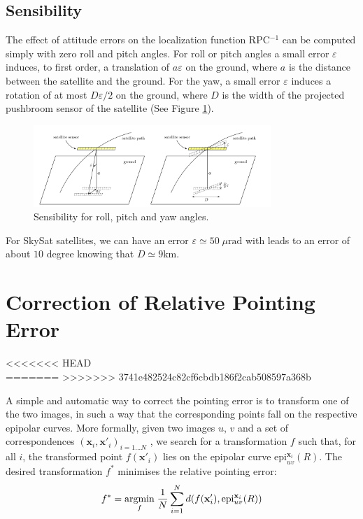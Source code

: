 \documentclass[paper=a4, fontsize=11pt, onecolumn, tikz, dvipsnames, svgnames, x11names]{article}
\begin{document}
\subsection{Sensibility}
\label{subsec:sensibility}
The effect of attitude errors on the localization function RPC$^{-1}$ can be computed simply with zero roll and pitch angles. For roll or pitch angles
a small error $\varepsilon$ induces, to first order, a translation of $a\varepsilon$ on the ground, where $a$ is
the distance between the satellite and the ground. For the yaw, a small error $\varepsilon$  induces
a rotation of at most $D\varepsilon/2$ on the ground, where $D$ is the width of the projected pushbroom sensor of the satellite (See Figure \ref{sensiblity}).

\begin{figure}[h]
    \centering
    \includegraphics[width=0.8\textwidth]{figures/sensibility.png}
   \caption{Sensibility for roll, pitch and yaw angles.}
   \label{sensiblity}
\end{figure}

For SkySat satellites, we can have an error $\varepsilon \simeq 50 \; \mu \text{rad}$ with leads to an error of about $10$ degree knowing that $D \simeq 9 \text{km}$.

\section{Correction of Relative Pointing Error}
<<<<<<< HEAD
\cite{carlo_2014_pushbroom}\\
=======
>>>>>>> 3741e482524c82cf6cbdb186f2cab508597a368b

A simple and automatic way to correct the pointing error is to transform one of the two images, in such a way that the corresponding points fall on the respective epipolar curves. More formally, given two images $u$, $v$ and a set of correspondences $(\textbf{x}_i , \textbf{x}'_i)_{i=1...N}$ , we search for a transformation $f$ such that, for all $i$, the transformed point $f(\textbf{x}'_i)$ lies on the epipolar curve $\text{epi}^{\textbf{x}_i}_{u v}(R)$.
The desired transformation $f^{*}$ minimises the relative pointing error:
\begin{align}
\label{minif}
f^* = \underset{f}{\operatorname{argmin}}\; \dfrac{1}{N} \sum\limits_{i=1}^{N} d(f(\textbf{x}'_i), \text{epi}^{\textbf{x}_i}_{u v}(R))
\end{align}
\end{document}
